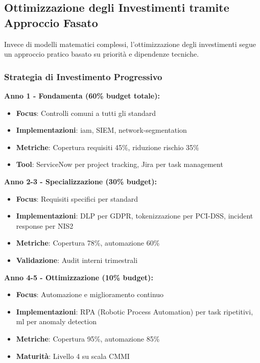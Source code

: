 \subsection{\texorpdfstring{Ottimizzazione degli Investimenti tramite Approccio Fasato}{4.6.2 - Ottimizzazione degli Investimenti tramite Approccio Fasato}}

Invece di modelli matematici complessi, l'ottimizzazione degli investimenti segue un approccio pratico basato su priorità e dipendenze tecniche\autocite{Bertsekas2017}.

\subsubsection{\texorpdfstring{Strategia di Investimento Progressivo}{4.6.2.1 - Strategia di Investimento Progressivo}}

\textbf{Anno 1 - Fondamenta (60\% budget totale):}
\begin{itemize}
    \item \textbf{Focus}: Controlli comuni a tutti gli standard
    \item \textbf{Implementazioni}: \gls{iam}, SIEM, \gls{network-segmentation}
    \item \textbf{Metriche}: Copertura requisiti 45\%, riduzione rischio 35\%
    \item \textbf{Tool}: ServiceNow per project tracking, Jira per task management
\end{itemize}

\textbf{Anno 2-3 - Specializzazione (30\% budget):}
\begin{itemize}
    \item \textbf{Focus}: Requisiti specifici per standard
    \item \textbf{Implementazioni}: DLP per GDPR, tokenizzazione per PCI-DSS, incident response per NIS2
    \item \textbf{Metriche}: Copertura 78\%, automazione 60\%
    \item \textbf{Validazione}: Audit interni trimestrali
\end{itemize}

\textbf{Anno 4-5 - Ottimizzazione (10\% budget):}
\begin{itemize}
    \item \textbf{Focus}: Automazione e miglioramento continuo
    \item \textbf{Implementazioni}: RPA (Robotic Process Automation) per task ripetitivi, \gls{ml} per anomaly detection
    \item \textbf{Metriche}: Copertura 95\%, automazione 85\%
    \item \textbf{Maturità}: Livello 4 su scala CMMI
\end{itemize}


